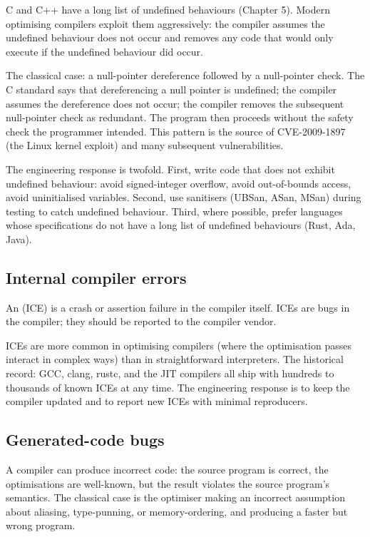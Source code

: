 C and C++ have a long list of undefined behaviours (Chapter 5). Modern optimising compilers exploit them aggressively: the compiler assumes the undefined behaviour does not occur and removes any code that would only execute if the undefined behaviour did occur.

The classical case: a null-pointer dereference followed by a null-pointer check. The C standard says that dereferencing a null pointer is undefined; the compiler assumes the dereference does not occur; the compiler removes the subsequent null-pointer check as redundant. The program then proceeds without the safety check the programmer intended. This pattern is the source of CVE-2009-1897 (the Linux kernel exploit) and many subsequent vulnerabilities.

The engineering response is twofold. First, write code that does not exhibit undefined behaviour: avoid signed-integer overflow, avoid out-of-bounds access, avoid uninitialised variables. Second, use sanitisers (UBSan, ASan, MSan) during testing to catch undefined behaviour. Third, where possible, prefer languages whose specifications do not have a long list of undefined behaviours (Rust, Ada, Java).

\subsection{Internal compiler errors}

An  (ICE) is a crash or assertion failure in the compiler itself. ICEs are bugs in the compiler; they should be reported to the compiler vendor.

ICEs are more common in optimising compilers (where the optimisation passes interact in complex ways) than in straightforward interpreters. The historical record: GCC, clang, rustc, and the JIT compilers all ship with hundreds to thousands of known ICEs at any time. The engineering response is to keep the compiler updated and to report new ICEs with minimal reproducers.

\subsection{Generated-code bugs}

A compiler can produce incorrect code: the source program is correct, the optimisations are well-known, but the result violates the source program's semantics. The classical case is the optimiser making an incorrect assumption about aliasing, type-punning, or memory-ordering, and producing a faster but wrong program.

